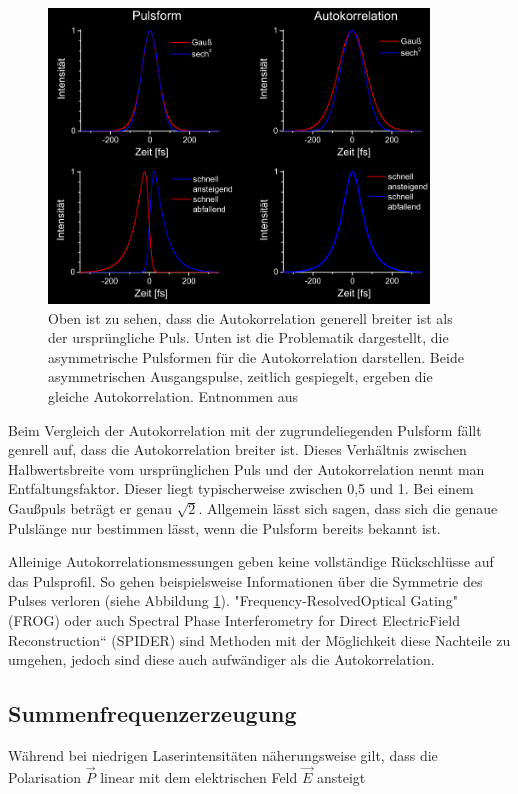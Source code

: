 \begin{figure}[H]
    \centering\captionsetup{format=plain}
    \includegraphics[width=0.9\textwidth]{bilder/AutoPulsform.png}
    \caption{Oben ist zu sehen, dass die Autokorrelation generell breiter ist als der ursprüngliche Puls. Unten ist die Problematik dargestellt, die asymmetrische Pulsformen für die Autokorrelation darstellen. Beide asymmetrischen Ausgangspulse, zeitlich gespiegelt, ergeben die gleiche Autokorrelation. Entnommen aus \cite{Pulsform}}
    \label{fig:Pulsform}
\end{figure}

Beim Vergleich der Autokorrelation mit der zugrundeliegenden Pulsform fällt genrell auf, dass die Autokorrelation breiter ist.
Dieses Verhältnis zwischen Halbwertsbreite vom ursprünglichen Puls und der Autokorrelation nennt man Entfaltungsfaktor.
Dieser liegt typischerweise zwischen 0,5 und 1. Bei einem Gaußpuls beträgt er genau $\sqrt{2}$.
Allgemein lässt sich sagen, dass sich die genaue Pulslänge nur bestimmen lässt, wenn die Pulsform bereits bekannt ist.

Alleinige Autokorrelationsmessungen geben keine vollständige Rückschlüsse auf das Pulsprofil.
So gehen beispielsweise Informationen über die Symmetrie des Pulses verloren (siehe Abbildung \ref{fig:Pulsform}).
"Frequency-ResolvedOptical Gating" (FROG) oder auch \dq Spectral Phase Interferometry for Direct ElectricField Reconstruction“ (SPIDER)
sind Methoden mit der Möglichkeit diese Nachteile zu umgehen, jedoch sind diese auch aufwändiger als die Autokorrelation.

\subsection{Summenfrequenzerzeugung}
Während bei niedrigen Laserintensitäten näherungsweise gilt, dass die Polarisation $\vec P$ linear mit dem elektrischen Feld $\vec E$ ansteigt

